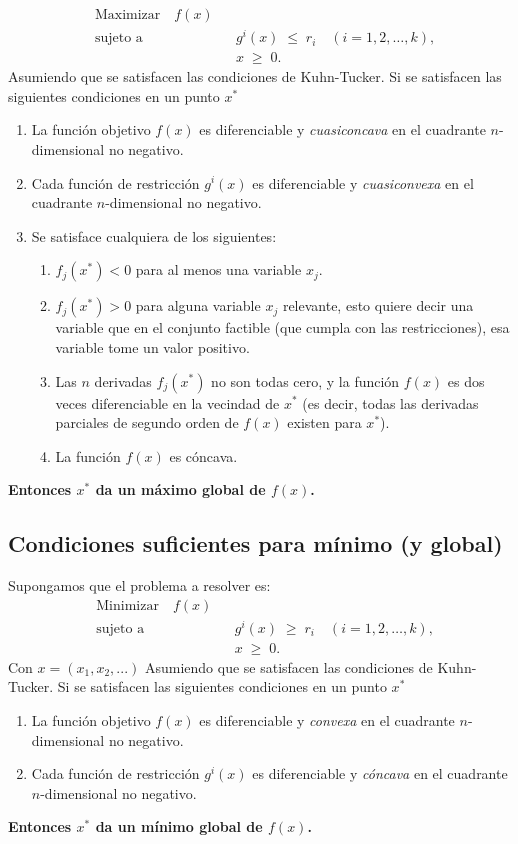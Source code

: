 \documentclass{article}
\begin{document}
\[
\begin{aligned}
&\text{Maximizar} \quad f(x) \\
&\text{sujeto a} \quad && g^{i}(x) \;\le\; r_{i}
\quad (i = 1,2,\dots,k),\\
& && x \;\ge\; 0.
\end{aligned}
\]
Asumiendo que se satisfacen las condiciones de Kuhn-Tucker.
Si se satisfacen las siguientes condiciones en un punto $x^*$
\begin{enumerate}\color{teal}
  \item La función objetivo \(f(x)\) es diferenciable y \emph{cuasiconcava} en el cuadrante \(n\)-dimensional no negativo.
  \item Cada función de restricción \(g^{i}(x)\) es diferenciable y \emph{cuasiconvexa} en el cuadrante \(n\)-dimensional no negativo.
  \item Se satisface cualquiera de los siguientes:
    \begin{enumerate}
      \item \(f_{j}(x^{*}) < 0\) para al menos una variable \(x_{j}\).
      \item \(f_{j}(x^{*}) > 0\) para alguna variable \(x_{j}\) relevante, esto quiere decir una variable que en el conjunto factible (que cumpla con las restricciones), esa variable tome un valor positivo.
      \item Las \(n\) derivadas \(f_{j}(x^{*})\) no son todas cero, y la función \(f(x)\) es dos veces diferenciable en la vecindad de \(x^{*}\) (es decir, todas las derivadas parciales de segundo orden de \(f(x)\) existen para \(x^{*}\)).
      \item La función \(f(x)\) es cóncava.
    \end{enumerate}
\end{enumerate}

\textbf{\color{teal}Entonces \(x^{*}\) da un máximo global de \(f(x)\).
}



\subsection*{Condiciones suficientes para mínimo (y global)}
Supongamos que el problema a resolver es:
\[
\begin{aligned}
&\text{Minimizar} \quad  f(x) \\
&\text{sujeto a} \quad && g^{i}(x) \;\ge\; r_{i}
\quad (i = 1,2,\dots,k),\\
& && x \;\ge\; 0.
\end{aligned}
\]
Con $x=(x_1,x_2,...)$
Asumiendo que se satisfacen las condiciones de Kuhn-Tucker.
Si se satisfacen las siguientes condiciones en un punto $x^*$
\begin{enumerate}\color{teal}
  \item La función objetivo \(f(x)\) es diferenciable y \emph{convexa} en el cuadrante \(n\)-dimensional no negativo.
  \item Cada función de restricción \(g^{i}(x)\) es diferenciable y \emph{cóncava} en el cuadrante \(n\)-dimensional no negativo.
\end{enumerate}
\textbf{\color{teal}Entonces \(x^{*}\) da un mínimo global de \(f(x)\).}
\end{document}
